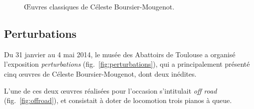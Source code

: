 \documentclass[french,A4paper,]{book}
\begin{document}
\begin{figure}
\centering

\hspace*{\fill}
\hfill%
\hspace*{\fill}

\caption{Œuvres classiques de Céleste Boursier-Mougenot.}

\label{fig:celeste-oeuvres}

\end{figure}

\subsection{Perturbations}\label{perturbations}

Du 31 janvier au 4 mai 2014, le musée des Abattoirs de Toulouse a
organisé l'exposition \emph{perturbations}
(fig.~\ref{fig:perturbations}), qui a principalement présenté cinq
œuvres de Céleste Boursier-Mougenot, dont deux inédites.

L'une de ces deux œuvres réalisées pour l'occasion s'intitulait
\emph{off road} (fig.~\ref{fig:offroad}), et consistait à doter de
locomotion trois pianos à queue.
\end{document}
